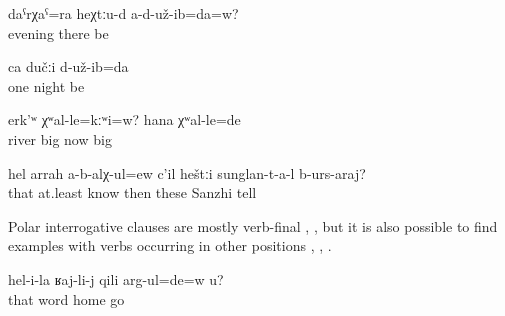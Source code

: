 \begin{exe}
	\ex	\label{ex:Did you not also spend the night there? We stayed one night}
	\begin{xlist}
		\ex	\label{ex:Did you not also spend the night there? We stayed one night@A}
		\gll	daˁrχaˁ=ra	heχtːu-d	a-d-už-ib=da=w?\\
			evening	there	be\\
		\glt	{}

		\ex	\label{ex:Did you not also spend the night there? We stayed one night@B}
		\gll	ca	dučːi	d-už-ib=da\\
			one	night	be\\
		\glt	{}
	\end{xlist}

	\ex	\label{ex:Was the river not big? Now it was big}
	\gll	erk'ʷ	χʷal-le=kːʷi=w? 	hana	χʷal-le=de\\
		river	big 	now	big\\
	\glt	{}

	\ex	\label{ex:‎Don't the Sanzhi people know at least that (story) to tell}
	\gll	hel	arrah	a-b-alχ-ul=ew	c'il	heštːi	sunglan-t-a-l	b-urs-araj?\\
		that	at.least	know	then	these	Sanzhi	tell	\\
	\glt	{}
\end{exe}

Polar interrogative clauses are mostly verb-final , , but it is also possible to find examples with verbs occurring in other positions , , .

\begin{exe}
	\ex	\label{ex:Are you going home because of what she said}
	\gll	hel-i-la	ʁaj-li-j	qili	arg-ul=de=w	u?	\\
		that	word	home	go		\\
	\glt	{}
\end{exe}

